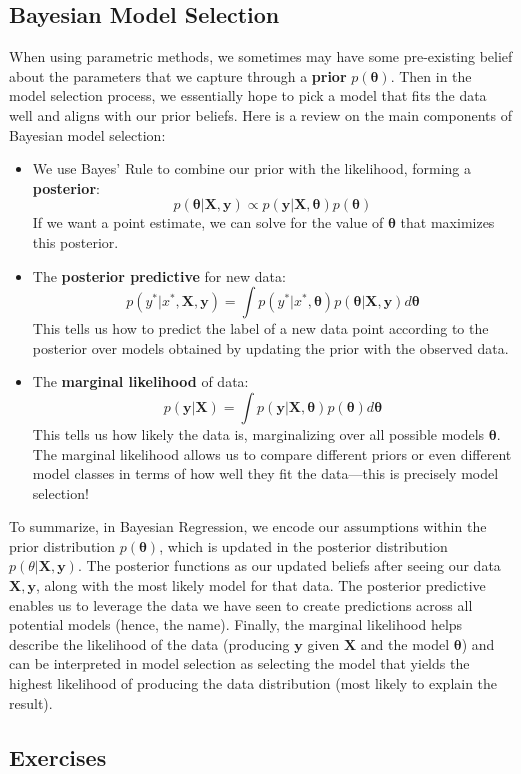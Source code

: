 \documentclass[11pt, letterpaper]{article}
\theoremstyle{definition}
\theoremstyle{plain}
\begin{document}
\subsection{Bayesian Model Selection}
When using parametric methods, we sometimes may have some pre-existing belief about the parameters that we capture through a \textbf{prior} $p(\bm \theta)$. Then in the model selection process, we essentially hope to pick a model that fits the data well and aligns with our prior beliefs. Here is a review on the main components of Bayesian model selection:
\begin{itemize}
	\item We use Bayes' Rule to combine our prior with the likelihood, forming a \textbf{posterior}: 
    \[p(\bm \theta | \bm X, \bm y) \propto p(\bm y|\bm X, \bm \theta) p(\bm \theta)\]
    If we want a point estimate, we can solve for the value of $\bm \theta$ that maximizes this posterior.
	\item The \textbf{posterior predictive} for new data: 
    \[p(y^*|x^*, \bm X, \bm y) = \int p(y^*|x^*, \bm \theta) p(\bm \theta | \bm X, \bm y) d\bm \theta\]
	This tells us how to predict the label of a new data point according to the posterior over models obtained by updating the prior with the observed data.
	\item The \textbf{marginal likelihood} of data: 
    \[p(\bm y|\bm X) = \int p(\bm y|\bm X, \bm \theta) p(\bm \theta) d\bm \theta\]
	This tells us how likely the data is, marginalizing over all possible models $\bm \theta$. The marginal likelihood allows us to compare different priors or even different model classes in terms of how well they fit the data---this is precisely model selection!
\end{itemize}
To summarize, in Bayesian Regression, we encode our assumptions within the prior distribution $p(\bm \theta)$, which is updated in the posterior distribution $p(\theta|\bm X,\bm y)$. The posterior functions as our updated beliefs after seeing our data $\bm X,\bm y$, along with the most likely model for that data. The posterior predictive enables us to leverage the data we have seen to create predictions across all potential models (hence, the name). Finally, the marginal likelihood helps describe the likelihood of the data (producing $\bm y$ given $\bm X$ and the model $\bm \theta$) and can be interpreted in model selection as selecting the model that yields the highest likelihood of producing the data distribution (most likely to explain the result).

\subsection{Exercises}
\end{document}
